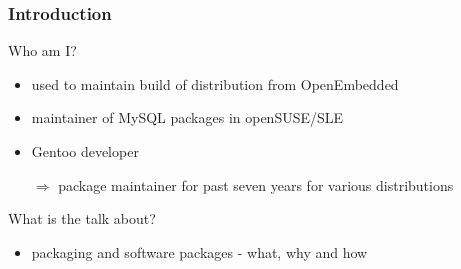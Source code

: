 \begin{frame}[t]
   \frametitle{Introduction}
   Who am I?
   \begin{itemize}
      \item used to maintain build of distribution from OpenEmbedded
      \item maintainer of MySQL packages in openSUSE/SLE
      \item Gentoo developer
      \vspace{0.5cm}
      \item[\(\Rightarrow\)] package maintainer for past seven years for various distributions
   \end{itemize}
   \vspace{1cm}
   What is the talk about?
   \begin{itemize}
      \item packaging and software packages - what, why and how
   \end{itemize}
\end{frame}

